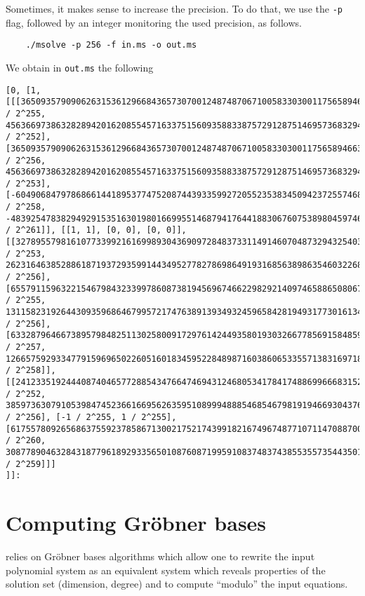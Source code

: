 \documentclass[a4paper,english,11pt]{scrartcl}
\theoremstyle{definition}
\theoremstyle{remark}
\begin{document}
Sometimes, it makes sense to increase the precision. To do that, we use the
\verb+-p+ flag, followed by an integer monitoring the used precision, as
follows.
\begin{tcolorbox} %
  \begin{verbatim}
    ./msolve -p 256 -f in.ms -o out.ms 
  \end{verbatim}
\end{tcolorbox}
We obtain in \verb+out.ms+ the following
\begin{tcolorbox} %
  \begin{lstlisting}
[0, [1,
[[[36509357909062631536129668436573070012487487067100583303001175658946635606055 / 2^255, 4563669738632828942016208554571633751560935883387572912875146957368329450757 / 2^252], [36509357909062631536129668436573070012487487067100583303001175658946635606055 / 2^256, 4563669738632828942016208554571633751560935883387572912875146957368329450757 / 2^253], [-60490684797868661441895377475208744393359927205523538345094237255746825568573 / 2^258, -483925478382949291535163019801669955146879417644188306760753898045974604548583 / 2^261]], [[1, 1], [0, 0], [0, 0]], [[3278955798161077339921616998930436909728483733114914607048732943254033559905 / 2^253, 26231646385288618719372935991443495277827869864919316856389863546032268479285 / 2^256], [6557911596322154679843233997860873819456967466229829214097465886508067119813 / 2^255, 13115823192644309359686467995721747638913934932459658428194931773016134239637 / 2^256], [63328796466738957984825113025800917297614244935801930326677856915848592681411 / 2^257, 126657592933477915969650226051601834595228489871603860653355713831697185362823 / 2^258]], [[2412335192444087404657728854347664746943124680534178417488699666831523534165 / 2^252, 38597363079105398474523661669562635951089994888546854679819194669304376546651 / 2^256], [-1 / 2^255, 1 / 2^255], [617557809265686375592378586713002175217439918216749674877107114708870024746325 / 2^260, 308778904632843187796189293356501087608719959108374837438553557354435012373163 / 2^259]]]
]]:
  \end{lstlisting}
\end{tcolorbox}


\section{Computing Gr\"obner bases}\label{sec:grobner}

\msolve relies on Gr\"obner bases algorithms which allow one to rewrite the
input polynomial system as an equivalent system which reveals properties of the
solution set (dimension, degree) and to compute ``modulo'' the input equations.
\end{document}

